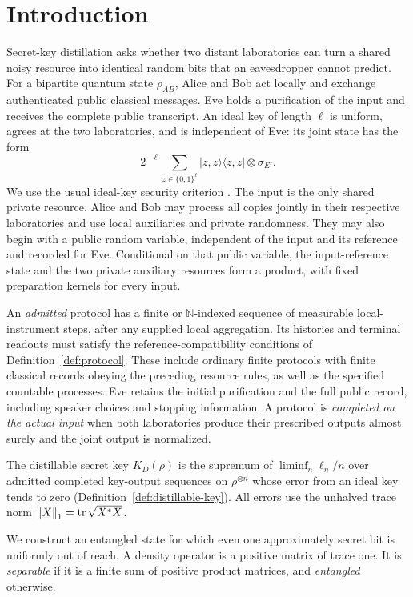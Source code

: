 \section{Introduction}

Secret-key distillation asks whether two distant laboratories can turn a
shared noisy resource into identical random bits that an eavesdropper cannot
predict.  For a bipartite quantum state $\rho_{AB}$, Alice and Bob act locally
and exchange authenticated public classical messages.  Eve holds a
purification of the input and receives the complete public transcript.  An
ideal key of length $\ell$ is uniform, agrees at the two laboratories, and is
independent of Eve: its joint state has the form
\[
 2^{-\ell}\sum_{z\in\{0,1\}^{\ell}}
 |z,z\rangle\langle z,z|\otimes\sigma_{E'}.
\]
We use the usual ideal-key security criterion
\cite{keyPrivateStates,RennerKonig05}.  The input is the only shared private
resource.  Alice and Bob may process all copies jointly in their respective
laboratories and use local auxiliaries and private randomness.
They may also begin with a public random variable, independent of the input
and its reference and recorded for Eve.  Conditional on that public
variable, the input-reference state and the two private auxiliary resources
form a product, with fixed preparation kernels for every input.

An \emph{admitted} protocol has a finite or $\mathbb N$-indexed sequence of
measurable local-instrument steps, after any supplied local aggregation.
Its histories and terminal readouts must satisfy the reference-compatibility
conditions of Definition~\ref{def:protocol}.  These include ordinary finite
protocols with finite classical records obeying the preceding resource rules,
as well as the specified countable processes.  Eve retains the initial
purification and the full public record, including speaker choices and
stopping information.  A protocol is \emph{completed on the actual input}
when both laboratories produce their prescribed outputs almost surely and
the joint output is normalized.

The distillable secret key $K_D(\rho)$ is the supremum of
$\liminf_n\ell_n/n$ over admitted completed key-output sequences on
$\rho^{\otimes n}$ whose error from an ideal key tends to zero
(Definition~\ref{def:distillable-key}).  All errors use the unhalved trace
norm $\left\lVert X\right\rVert_1=\operatorname{tr}\sqrt{X^*X}$.

We construct an entangled state for which even one approximately secret bit
is uniformly out of reach.  A density operator is a positive matrix of trace
one.  It is \emph{separable} if it is a finite sum of positive product
matrices, and \emph{entangled} otherwise.

